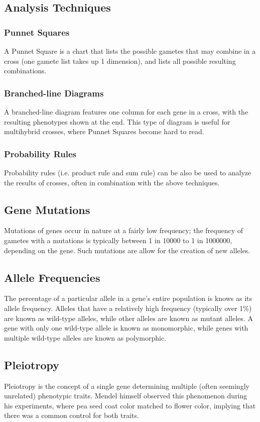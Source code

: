 \documentclass[12pt,titlepage]{article}
\begin{document}
      \subsection{Analysis Techniques}
        \subsubsection{Punnet Squares}
          A Punnet Square is a chart that lists the possible gametes that may combine in a cross (one gamete list takes up 1 dimension), and lists all
          possible resulting combinations.

        \subsubsection{Branched-line Diagrams}
          A branched-line diagram features one column for each gene in a cross, with the resulting phenotypes shown at the end. This type of diagram
          is useful for multihybrid crosses, where Punnet Squares become hard to read.

        \subsubsection{Probability Rules}
          Probability rules (i.e. product rule and sum rule) can be also be used to analyze the results of crosses, often in combination with the above
          techniques.

      \subsection{Gene Mutations}
        Mutations of genes occur in nature at a fairly low frequency; the frequency of gametes with a mutations is typically between 1 in 10000 to 1 in 1000000,
        depending on the gene. Such mutations are allow for the creation of new alleles.

      \subsection{Allele Frequencies}
        The percentage of a particular allele in a gene's entire population is knows as its allele frequency. Alleles that have a relatively high frequency
        (typically over 1\%) are known as wild-type alleles, while other alleles are known as mutant alleles. A gene with only one wild-type allele is known
        as monomorphic, while genes with multiple wild-type alleles are known as polymorphic.

      \subsection{Pleiotropy}
        Pleiotropy is the concept of a single gene determining multiple (often seemingly unrelated) phenotypic traits. Mendel himself observed this phenomenon
        during his experiments, where pea seed coat color matched to flower color, implying that there was a common control for both traits.
\end{document}
